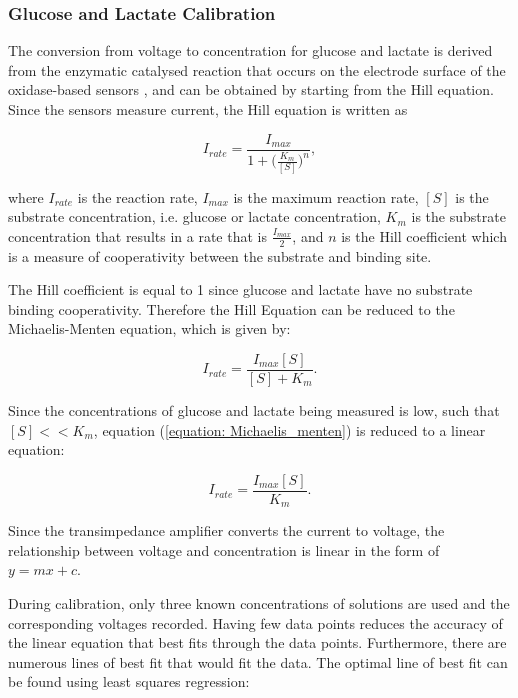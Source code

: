 \subsubsection{Glucose and Lactate Calibration}

The conversion from voltage to concentration for glucose and lactate is derived from the enzymatic catalysed reaction that occurs on the electrode surface of the oxidase-based sensors \cite{Patel2011, Rogers2017}, and can be obtained by starting from the Hill equation. Since the sensors measure current, the Hill equation is written as

\begin{equation}
    I_{rate} = \frac{I_{max}}{1 + \big( \frac{K_{m}}{[S]} \big)^{n}},
    \label{equation: Hill equation}
\end{equation}

\noindent where $I_{rate}$ is the reaction rate, $I_{max}$ is the maximum reaction rate, $[S]$ is the substrate concentration, i.e. glucose or lactate concentration, $K_{m}$ is the substrate concentration that results in a rate that is $\frac{I_{max}}{2}$, and $n$ is the Hill coefficient which is a measure of cooperativity between the substrate and binding site.

The Hill coefficient is equal to 1 since glucose and lactate have no substrate binding cooperativity. Therefore the Hill Equation can be reduced to the Michaelis-Menten equation, which is given by:

\begin{equation}
    I_{rate} = \frac{I_{max}[S]}{[S] + K_{m}}.
    \label{equation: Michaelis_menten}
\end{equation}

Since the concentrations of glucose and lactate being measured is low, such that $[S] << K_{m}$, equation (\ref{equation: Michaelis_menten}) is reduced to a linear equation:

\begin{equation}
    I_{rate} = \frac{I_{max}[S]}{K_{m}}.
    \label{equation: reduced Michaelis_menten}
\end{equation}

\noindent Since the transimpedance amplifier converts the current to voltage, the relationship between voltage and concentration is linear in the form of $y = mx + c$.

During calibration, only three known concentrations of solutions are used and the corresponding voltages recorded. Having few data points reduces the accuracy of the linear equation that best fits through the data points. Furthermore, there are numerous lines of best fit that would fit the data. The optimal line of best fit can be found using least squares regression:

